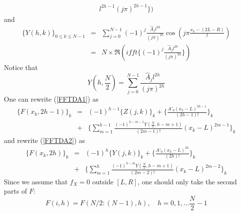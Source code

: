\documentclass[numreferences]{kluwer}    %
\begin{document}
\begin{article}
\begin{eqnarray*}
{l^{2h-1}}{(j\pi)^{2h-1}} \})
\end{eqnarray*}
and
\begin{eqnarray*}
\{Y(h,k)\}_{0\le k \le N-1} &=& \sum_{j=0}^{N-1}(-1)^j\frac{\hat{A}_j
l^{2h}}{(j\pi)^{2h}}   \cos(j\pi\frac{x_k-(2L-R)}{l})\\
&=&N\times \Re (ifft\{ (-1)^j \frac{\hat{A}_j
l^{2h}}{(j\pi)^{2h}} \})
\end{eqnarray*}
Notice that
\[
Y(h,\frac{N}2)=\sum_{j=0}^{N-1}\frac{\hat{A}_j
l^{2h}}{(j\pi)^{2h}} 
\]
One can rewrite (\ref{FFTDA1}) as
\begin{eqnarray}
  \{F(x_k,2h-1)\}_k &=& (-1)^{h-1} \{Z(j,k)\}_k + \{\frac{A'_0(x_k-L)^{2h-1}}{(2h-1)!}\}_k \label{FFTDA11} \\
&+& \{\sum_{m=1}^{h-1}\frac{(-1)^{h-m-1}Y(\frac{N}2,h-m+1)}{(2m-1)!} (x_k-L)^{2m-1}\}_k\nonumber
\end{eqnarray}
and rewrite (\ref{FFTDA2}) as
\begin{eqnarray}
  \{F(x_k,2h)\}_k &=& (-1)^{h} \{Y(j,k)\}_k + \{\frac{A'_0(x_k-L)^{2h}}{(2h)!}\}_k \label{FFTDA22} \\
&+& \{\sum_{m=1}^{h}\frac{(-1)^{h-m}Y(\frac{N}2,h-m+1)}{(2m-2)!} (x_k-L)^{2m-2}\}_k\nonumber
\end{eqnarray}
Since we assume that $f_X=0$ outside $[L,R]$, one should only take the second parts of $F$:
\[
F(i,h)=F(N/2:(N-1),h), \quad h=0,1,\dots \frac{N}2-1
\]

\end{article}
\end{document}
